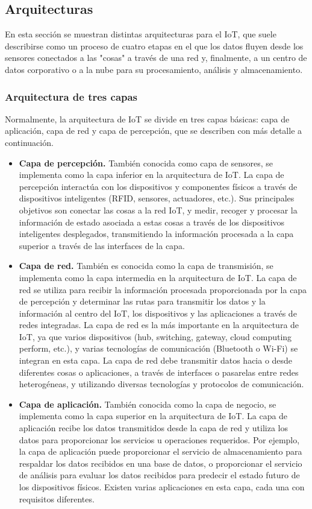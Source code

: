 {\subsection{Arquitecturas}

En esta sección se muestran distintas arquitecturas para el IoT, que suele describirse como un proceso de cuatro etapas en el que los datos fluyen desde los sensores conectados a las "cosas" a través de una red y, finalmente, a un centro de datos corporativo o a la nube para su procesamiento, análisis y almacenamiento.

\subsubsection{Arquitectura de tres capas}

Normalmente, la arquitectura de IoT se divide en tres capas básicas: capa de aplicación, capa de red y capa de percepción, que se describen con más detalle a continuación.

\begin{itemize}
    \item \textbf{Capa de percepción.} También conocida como capa de sensores, se implementa como la capa inferior en la arquitectura de IoT. La capa de percepción interactúa con los dispositivos y componentes físicos a través de dispositivos inteligentes (RFID, sensores, actuadores, etc.). Sus principales objetivos son conectar las cosas a la red IoT, y medir, recoger y procesar la información de estado asociada a estas cosas a través de los dispositivos inteligentes desplegados, transmitiendo la información procesada a la capa superior a través de las interfaces de la capa.
    \item \textbf{Capa de red.} También es conocida como la capa de transmisión, se implementa como la capa intermedia en la arquitectura de IoT. La capa de red se utiliza para recibir la información procesada proporcionada por la capa de percepción y determinar las rutas para transmitir los datos y la información al centro del IoT, los dispositivos y las aplicaciones a través de redes integradas. La capa de red es la más importante en la arquitectura de IoT, ya que varios dispositivos (hub, switching, gateway, cloud computing perform, etc.), y varias tecnologías de comunicación (Bluetooth o Wi-Fi) se integran en esta capa. La capa de red debe transmitir datos hacia o desde diferentes cosas o aplicaciones, a través de interfaces o pasarelas entre redes heterogéneas, y utilizando diversas tecnologías y protocolos de comunicación.
    \item \textbf{Capa de aplicación.} También conocida como la capa de negocio, se implementa como la capa superior en la arquitectura de IoT. La capa de aplicación recibe los datos transmitidos desde la capa de red y utiliza los datos para proporcionar los servicios u operaciones requeridos. Por ejemplo, la capa de aplicación puede proporcionar el servicio de almacenamiento para respaldar los datos recibidos en una base de datos, o proporcionar el servicio de análisis para evaluar los datos recibidos para predecir el estado futuro de los dispositivos físicos. Existen varias aplicaciones en esta capa, cada una con requisitos diferentes.


\end{itemize}}
